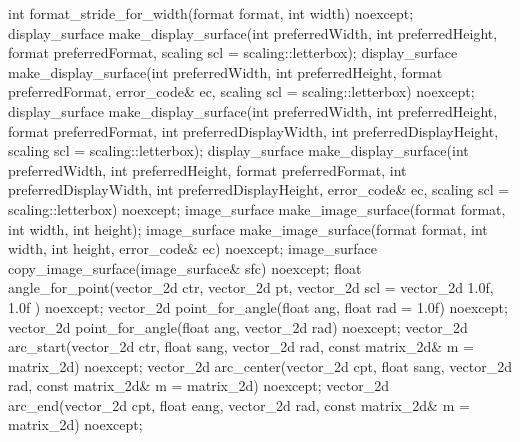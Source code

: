 \begin{codeblock}
{{{{  int format_stride_for_width(format format, int width) noexcept;
  display_surface make_display_surface(int preferredWidth,
    int preferredHeight, format preferredFormat,
    scaling scl = scaling::letterbox);
  display_surface make_display_surface(int preferredWidth,
    int preferredHeight, format preferredFormat, error_code& ec,
    scaling scl = scaling::letterbox) noexcept;
  display_surface make_display_surface(int preferredWidth,
    int preferredHeight, format preferredFormat, int preferredDisplayWidth, 
    int preferredDisplayHeight, scaling scl = scaling::letterbox);
  display_surface make_display_surface(int preferredWidth,
    int preferredHeight, format preferredFormat, int preferredDisplayWidth, 
    int preferredDisplayHeight, error_code& ec,
    scaling scl = scaling::letterbox) noexcept;
  image_surface make_image_surface(format format, int width, int height);
  image_surface make_image_surface(format format, int width, int height, 
    error_code& ec) noexcept;
  image_surface copy_image_surface(image_surface& sfc) noexcept;
  float angle_for_point(vector_2d ctr, vector_2d pt,
    vector_2d scl = vector_2d{ 1.0f, 1.0f }) noexcept;
  vector_2d point_for_angle(float ang, float rad = 1.0f) noexcept;
  vector_2d point_for_angle(float ang, vector_2d rad) noexcept;
  vector_2d arc_start(vector_2d ctr, float sang, vector_2d rad, 
    const matrix_2d& m = matrix_2d{}) noexcept;
  vector_2d arc_center(vector_2d cpt, float sang, vector_2d rad, 
    const matrix_2d& m = matrix_2d{}) noexcept;
  vector_2d arc_end(vector_2d cpt, float eang, vector_2d rad, 
    const matrix_2d& m = matrix_2d{}) noexcept;
} } } }

\end{codeblock}
%
